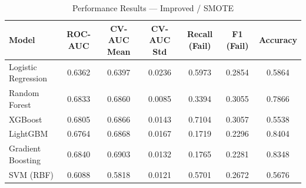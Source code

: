 \begin{table}[htbp]
\caption{Performance Results — Improved / SMOTE}
\label{tab:improved_smote}
\begin{tabular}{lcccccc}
\toprule

Model & ROC-AUC & CV-AUC Mean & CV-AUC Std & Recall (Fail) & F1 (Fail) & Accuracy \\
\midrule

Logistic Regression & 0.6362 & 0.6397 & 0.0236 & 0.5973 & 0.2854 & 0.5864 \\
Random Forest & 0.6833 & 0.6860 & 0.0085 & 0.3394 & 0.3055 & 0.7866 \\
XGBoost & 0.6805 & 0.6866 & 0.0143 & 0.7104 & 0.3057 & 0.5538 \\
LightGBM & 0.6764 & 0.6868 & 0.0167 & 0.1719 & 0.2296 & 0.8404 \\
Gradient Boosting & 0.6840 & 0.6903 & 0.0132 & 0.1765 & 0.2281 & 0.8348 \\
SVM (RBF) & 0.6088 & 0.5818 & 0.0121 & 0.5701 & 0.2672 & 0.5676 \\
\bottomrule

\end{tabular}
\end{table}
